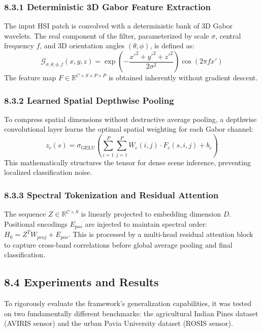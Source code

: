 \documentclass[11pt, letterpaper]{article}
\begin{document}
\subsubsection{8.3.1 Deterministic 3D Gabor Feature Extraction}
The input HSI patch is convolved with a deterministic bank of 3D Gabor wavelets. The real component of the filter, parameterized by scale $\sigma$, central frequency $f$, and 3D orientation angles $(\theta, \phi)$, is defined as:
\begin{equation}
\mathcal{G}_{\sigma, \theta, \phi, f}(x,y,z) = \exp\left(-\frac{x'^2 + y'^2 + z'^2}{2\sigma^2}\right) \cos(2\pi f x')
\end{equation}
The feature map $F \in \mathbb{R}^{C \times S \times P \times P}$ is obtained inherently without gradient descent.

\subsubsection{8.3.2 Learned Spatial Depthwise Pooling}
To compress spatial dimensions without destructive average pooling, a depthwise convolutional layer learns the optimal spatial weighting for each Gabor channel:
\begin{equation}
z_c(s) = \sigma_{\mathrm{GELU}} \left( \sum_{i=1}^{P} \sum_{j=1}^{P} W_{c}(i,j) \cdot F_{c}(s, i, j) + b_c \right)
\end{equation}
This mathematically structures the tensor for dense scene inference, preventing localized classification noise.

\subsubsection{8.3.3 Spectral Tokenization and Residual Attention}
The sequence $Z \in \mathbb{R}^{C \times S}$ is linearly projected to embedding dimension $D$. Positional encodings $E_{pos}$ are injected to maintain spectral order: $H_0 = Z^T W_{proj} + E_{pos}$. This is processed by a multi-head residual attention block to capture cross-band correlations before global average pooling and final classification.

\subsection{8.4 Experiments and Results}
To rigorously evaluate the framework's generalization capabilities, it was tested on two fundamentally different benchmarks: the agricultural Indian Pines dataset (AVIRIS sensor) and the urban Pavia University dataset (ROSIS sensor).
\end{document}
